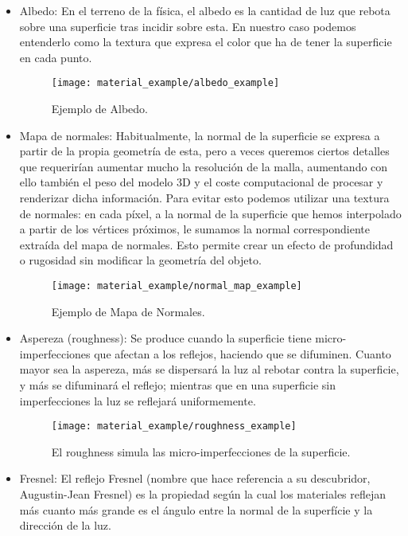 \begin{itemize}
    \item Albedo: En el terreno de la física, el albedo es la cantidad de luz que rebota sobre una superficie tras incidir sobre esta\cite{def_albedo}. En nuestro caso podemos entenderlo como la textura que expresa el color que ha de tener la superficie en cada punto.
    \begin{figure}[H]
        \centering
        \texttt{[image: material\_example/albedo\_example]}
        \caption{Ejemplo de Albedo\cite{free_pbr}.}
        \label{fig:albedo_ex}
    \end{figure}
    \item Mapa de normales: Habitualmente, la normal de la superficie se expresa a partir de la propia geometría de esta, pero a veces queremos ciertos detalles que requerirían aumentar mucho la resolución de la malla, aumentando con ello también el peso del modelo 3D y el coste computacional de procesar y renderizar dicha información. Para evitar esto podemos utilizar una textura de normales: en cada píxel, a la normal de la superficie que hemos interpolado a partir de los vértices próximos, le sumamos la normal correspondiente extraída del mapa de normales. Esto permite crear un efecto de profundidad o rugosidad sin modificar la geometría del objeto.
    \begin{figure}[H]
        \centering
        \texttt{[image: material\_example/normal\_map\_example]}
        \caption{Ejemplo de Mapa de Normales\cite{free_pbr}.}
        \label{fig:normal_map_ex}
    \end{figure}
    \item Aspereza (roughness): Se produce cuando la superficie tiene micro-imperfecciones que afectan a los reflejos, haciendo que se difuminen. Cuanto mayor sea la aspereza, más se dispersará la luz al rebotar contra la superficie, y más se difuminará el reflejo; mientras que en una superficie sin imperfecciones la luz se reflejará uniformemente.
    \begin{figure}[H]
        \centering
        \texttt{[image: material\_example/roughness\_example]}
        \caption{El roughness simula las micro-imperfecciones de la superficie.}
        \label{fig:roughness_ex}
    \end{figure}
    \item Fresnel\cite{marmoset_basicpbr}: El reflejo Fresnel (nombre que hace referencia a su descubridor, Augustin-Jean Fresnel) es la propiedad según la cual los materiales reflejan más cuanto más grande es el ángulo entre la normal de la superfície y la dirección de la luz.

\end{itemize}
